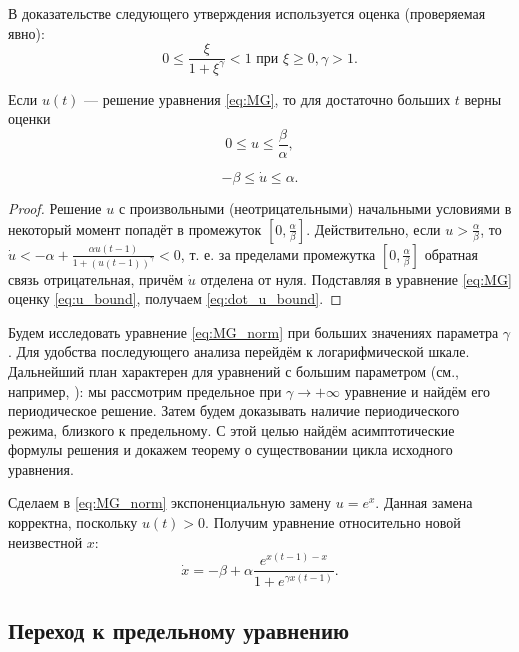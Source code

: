В доказательстве следующего утверждения используется оценка (проверяемая явно):
%
\[
 0 \leq \dfrac{\xi}{1 + \xi^{\gamma}} < 1 \text{ при } \xi \geq 0, \gamma > 1.
\]


\begin{proposition}
	\label{prop:boundness}
	Если $u(t)$ --- решение уравнения \eqref{eq:MG}, то для достаточно больших $t$ верны оценки
	\begin{equation}
		\label{eq:u_bound}
		0 \leq u \leq \frac{\beta}{\alpha},
	\end{equation}
	
	\begin{equation}
		\label{eq:dot_u_bound}
		-\beta \leq \dot{u} \leq \alpha.
	\end{equation}
\end{proposition}
\begin{proof}
	Решение $u$ с произвольными (неотрицательными) начальными условиями в некоторый момент попадёт в промежуток $[0, \frac{\alpha}{\beta}]$. Действительно, если $u > \frac{\alpha}{\beta}$, то $\dot{u} < -\alpha + \frac{\alpha u(t - 1)}{1 + (u(t - 1))^{\gamma}} < 0$, т. е. за пределами промежутка $[0, \frac{\alpha}{\beta}]$ обратная связь отрицательная, причём $\dot{u}$ отделена от нуля. Подставляя в уравнение \eqref{eq:MG} оценку \eqref{eq:u_bound}, получаем \eqref{eq:dot_u_bound}.
\end{proof}

Будем исследовать уравнение \eqref{eq:MG_norm} при больших значениях параметра $\gamma$. Для удобства последующего анализа перейдём к логарифмической шкале. Дальнейший план характерен для уравнений с большим параметром (см., например, \cite{Kolesov2010}): мы рассмотрим предельное при $\gamma\to+\infty$ уравнение и найдём его периодическое решение. Затем будем доказывать наличие периодического режима, близкого к предельному. С этой целью найдём асимптотические формулы решения и докажем теорему о существовании цикла исходного уравнения.

Сделаем в \eqref{eq:MG_norm} экспоненциальную замену $u=e^x$. Данная замена корректна, поскольку $u(t) > 0$. Получим уравнение относительно новой неизвестной $x$:
\begin{equation}
    \label{eq:MG_x}
    \dot{x}=-\beta+\alpha\frac{e^{x(t-1)-x}}{1+e^{\gamma x(t-1)}}.
\end{equation}

\subsection{Переход к предельному уравнению}

